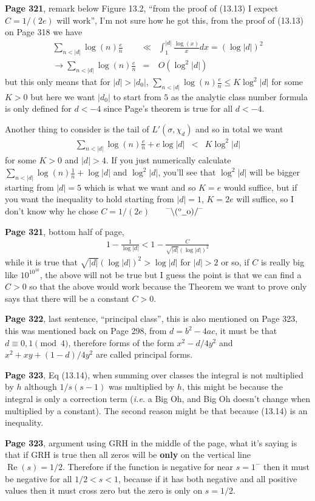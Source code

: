 \documentclass[aps,preprint,preprintnumbers,nofootinbib,showpacs,prd]{revtex4-1}
\newcommand{\ie}{{\it i.e.} }
\newcommand{\nbea}{\begin{eqnarray*}}
\newcommand{\neea}{\end{eqnarray*}}
\newcommand{\dunno}{$ {}^{\mbox {--}}\backslash(^{\rm o}{}\underline{\hspace{0.2cm}}{\rm o})/^{\mbox {--}}$}
\DeclareMathOperator{\re}{Re}
\begin{document}
{\bf Page 321}, remark below Figure 13.2, ``from the proof of (13.13) I expect $C=1/(2e)$ will work'', I'm not sure how he got this, from the proof of (13.13) on Page 318 we have
%
\nbea
\sum_{n<|d|} \log(n)\frac{e}{n} & \ll & \int_1^{|d|} \frac{\log(x)}{x} dx = (\log|d|)^2 \\
\to \sum_{n<|d|} \log(n)\frac{e}{n} & = & O(\log^2|d|)
\neea
%
but this only means that for $|d| > |d_0|$, $\sum_{n<|d|} \log(n)\frac{e}{n} \le K\log^2|d|$ for some $K > 0$ but here we want $|d_0|$ to start from $5$ as the analytic class number formula is only defined for $d < -4$ since Page's theorem is true for all $d < -4$.

Another thing to consider is the tail of $L'(\sigma,\chi_d)$ and so in total we want
%
\nbea
\sum_{n<|d|} \log(n)\frac{e}{n}  + e\log|d|& < & K\log^2|d|
\neea
%
for some $K>0$ and $|d| > 4$. If you just numerically calculate $\sum_{n<|d|} \log(n)\frac{1}{n} + \log|d|$ and $\log^2|d|$, you'll see that $\log^2|d|$ will be bigger starting from $|d| = 5$ which is what we want and so $K=e$ would suffice, but if you want the inequality to hold starting from $|d|=1$, $K=2e$ will suffice, so I don't know why he chose $C = 1/(2e)$ ~~~\dunno

{\bf Page 321}, bottom half of page,
%
\nbea
1 - \frac{1}{\log|d|} < 1 - \frac{C}{\sqrt{|d|}(\log|d|)^2}
\neea
%
while it is true that $\sqrt{|d|}(\log|d|)^2 > \log|d|$ for $|d| > 2$ or so, if $C$ is really big like $10^{10^{10}}$, the above will not be true but I guess the point is that we can find a $C>0$ so that the above would work because the Theorem we want to prove only says that there will be a constant $C>0$.

{\bf Page 322}, last sentence, ``principal class'', this is also mentioned on Page 323, this was mentioned back on Page 298, from $d=b^2-4ac$, it must be that $d \equiv 0,1 \pmod{4}$, therefore forms of the form $x^2 - d/4y^2$ and $x^2 + xy + (1-d)/4 y^2$ are called principal forms.

{\bf Page 323}, Eq (13.14), when summing over classes the integral is not multiplied by $h$ although $1/s(s-1)$ was multiplied by $h$, this might be because the integral is only a correction term (\ie a Big Oh, and Big Oh doesn't change when multiplied by a constant). The second reason might be that because (13.14) is an inequality.

{\bf Page 323}, argument using GRH in the middle of the page, what it's saying is that if GRH is true then all zeros will be {\bf only} on the vertical line $\re(s) = 1/2$. Therefore if the function is negative for near $s=1^-$  then it must be negative for all $1/2 < s < 1$, because if it has both negative and all positive values then it must cross zero but the zero is only on $s=1/2$.
\end{document}
